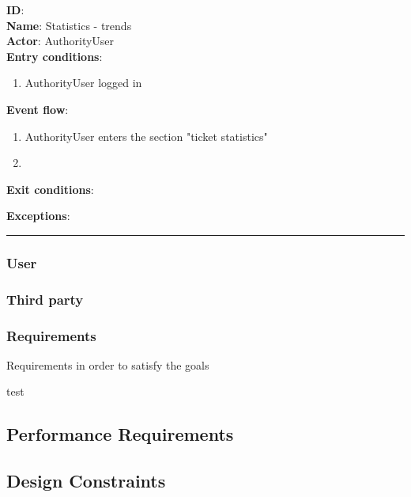     \textbf{ID}:  \\
    \textbf{Name}: Statistics - trends \\
    \textbf{Actor}: AuthorityUser   \\
    \textbf{Entry conditions}:
    \begin{enumerate}
      \item{AuthorityUser logged in}
    \end{enumerate}
    \textbf{Event flow}:
    \begin{enumerate}
      \item {AuthorityUser enters the section "ticket statistics"}
      \item
    \end{enumerate}
    \textbf{Exit conditions}:
    \begin{enumerate}

    \end{enumerate}
    \textbf{Exceptions}:
    \begin{enumerate}

    \end{enumerate}
    \rule{\linewidth}{0.4pt}


\subsubsection{User}
\subsubsection{Third party}

\subsubsection{Requirements}
Requirements in order to satisfy the goals
\begin{enumerate}
   test
\end{enumerate}



\subsection{Performance Requirements}

\subsection{Design Constraints}%

